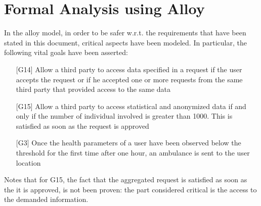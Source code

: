 \section{Formal Analysis using Alloy}
In the alloy model, in order to be safer w.r.t. the requirements that have been stated in this document, critical aspects have been modeled. 
In particular, the following vital goals have been asserted:
\begin{enumerate}
\item[{[G14]}]  Allow a third party to access data specified in a request if the user accepts the request or if he accepted one or more requests from the same third party that provided access to the same data 
\item[{[G15]}] Allow a third party to access statistical and anonymized data if and only if the number of individual involved is greater than 1000. This is satisfied as soon as the request is approved  
\item[{[G3]}] Once the health parameters of a user have been observed below the threshold for the first time after one hour, an ambulance is sent to the user location
\end{enumerate}

Notes that for G15, the fact that the aggregated request is satisfied as soon as the it is approved, is not been proven: the part considered critical is the access to the demanded information. \\



